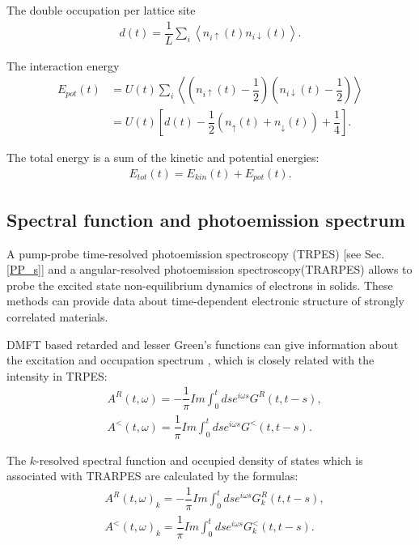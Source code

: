 The double occupation per lattice site
\begin{align}
\label{Double_occupation}
d(t)=\dfrac{1}{L}\sum_i{ \left\langle {n}_{i\uparrow}(t) {n}_{i\downarrow}(t) \right\rangle }.
\end{align}

The interaction energy
\begin{align}
\label{Interaction_energy}
E_{pot}(t)
&
=U(t) \sum_{i}\left\langle 
\left( {n}_{i\uparrow}(t)-\dfrac{1}{2} \right) 
\left( {n}_{i\downarrow}(t)-\dfrac{1}{2} \right) \right\rangle
\\ 
&
= U(t)\left[ d(t)-\dfrac{1}{2} \left({n}_{\uparrow}(t) + {n}_{\downarrow}(t) \right) +\dfrac{1}{4} \right]. 
\end{align}

The total energy is a sum of the kinetic and potential energies:
\begin{align}
\label{Total_energy}
E_{tot}(t)=E_{kin}(t)+E_{pot}(t).
\end{align}

\FloatBarrier
\subsection{Spectral function and photoemission spectrum}
\label{subsection:Spectral_function}
A pump-probe time-resolved photoemission spectroscopy (TRPES) [see Sec. \ref{PP_s}] and a angular-resolved photoemission spectroscopy(TRARPES) allows to probe the excited state non-equilibrium dynamics of electrons in solids. These methods can provide data about time-dependent electronic structure of strongly correlated materials.

DMFT based retarded and lesser Green's functions can give information about the excitation and occupation spectrum \citep{PhysRevB.81.115131}, which is closely related with the intensity in TRPES:
\begin{align}
\label{Spectr_R_L_1}
&
A^R(t,\omega)=-\dfrac{1}{\pi}Im \int_0^t ds e^{i\omega s}G^R(t,t-s),
\\
&
A^<(t,\omega)=\dfrac{1}{\pi}Im \int_0^t ds e^{i\omega s}G^<(t,t-s).
\label{Spectr_R_L_2}
\end{align}

The $k$-resolved spectral function and occupied density of states which is associated with TRARPES are calculated by the formulas:
\begin{align}
\label{Spectr_R_L_k_1}
&
A^R(t,\omega)_k=-\dfrac{1}{\pi}Im \int_0^t ds e^{i\omega s}G^R_k(t,t-s),
\\
&
A^<(t,\omega)_k=\dfrac{1}{\pi}Im \int_0^t ds e^{i\omega s}G^<_k(t,t-s).
\label{Spectr_R_L_k_2}
\end{align}


